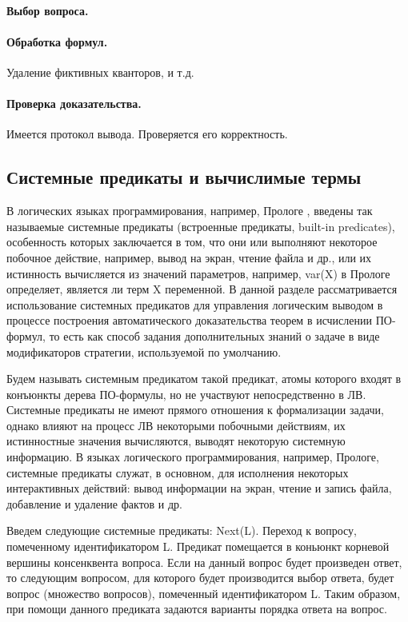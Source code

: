 \paragraph{Выбор вопроса.}

\paragraph{Обработка формул.} Удаление фиктивных кванторов, и т.д.

\paragraph{Проверка доказательства.} Имеется протокол вывода. Проверяется его корректность.

\subsection{Системные предикаты и вычислимые термы}
В логических языках программирования, например, Прологе \cite{Bratko}, введены так называемые системные предикаты (встроенные предикаты, built-in predicates), особенность которых заключается в том, что они или выполняют некоторое побочное действие, например, вывод на экран, чтение файла и др., или их истинность вычисляется из значений параметров, например, var(X) в Прологе определяет, является ли терм X переменной. В данной разделе рассматривается использование системных предикатов для управления логическим выводом в процессе построения автоматического доказательства теорем в исчислении ПО-формул, то есть как способ задания дополнительных знаний о задаче в виде модификаторов стратегии, используемой по умолчанию.

Будем называть системным предикатом такой предикат, атомы которого входят в конъюнкты дерева ПО-формулы, но не участвуют непосредственно в ЛВ. Системные предикаты не имеют прямого отношения к формализации задачи, однако влияют на процесс ЛВ некоторыми побочными действиям, их истинностные значения вычисляются, выводят некоторую системную информацию. В языках логического программирования, например, Прологе, системные предикаты служат, в основном, для исполнения некоторых интерактивных действий: вывод информации на экран, чтение и запись файла, добавление и удаление фактов и др.

Введем следующие системные предикаты:
Next(L). Переход к вопросу, помеченному идентификатором L. Предикат помещается в коньюнкт корневой вершины консенквента вопроса.  Если на данный вопрос будет произведен ответ, то следующим вопросом, для которого будет производится выбор ответа, будет вопрос (множество вопросов), помеченный идентификатором L. Таким образом, при помощи данного предиката задаются варианты порядка ответа на вопрос.

